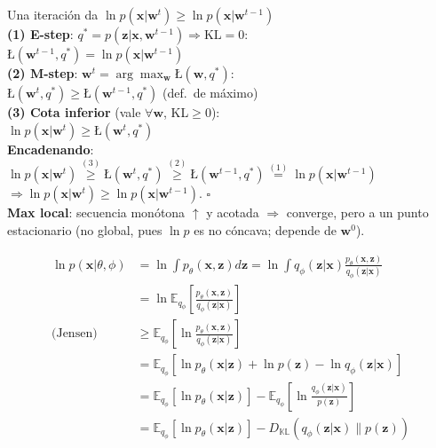 \documentclass[10pt, a4paper]{article}
\newcommand{\w}{\mathbf{w}}
\newcommand{\x}{\mathbf{x}}
\newcommand{\z}{\mathbf{z}}
\newcommand{\ELBO}{\text{\L}}
\newcommand{\E}{\mathbb{E}}
\begin{document}
\begin{minipage}[t]{0.3299\textwidth}
\begin{tcolorbox}[formulabox=Demo: Convergencia de EM, colframe=softBrown]
    Una iteración da $\ln p(\x|\w^t) \geq \ln p(\x|\w^{t-1})$\\
    \textbf{(1) E-step}: $q^* = p(\z|\x,\w^{t-1}) \Rightarrow \text{KL}=0$:\\
    $\ELBO(\w^{t-1},q^*) = \ln p(\x|\w^{t-1})$ \\
    \textbf{(2) M-step}: $\w^t = \arg\max_\w \ELBO(\w,q^*)$:\\
    $\ELBO(\w^t,q^*) \geq \ELBO(\w^{t-1},q^*)$ \quad (def.\ de máximo)\\
    \textbf{(3) Cota inferior} (vale $\forall\w$, KL$\geq 0$):\\
    $\ln p(\x|\w^t) \geq \ELBO(\w^t,q^*)$\\
    \textbf{Encadenando}:\\
    $\ln p(\x|\w^t) \overset{(3)}{\geq} \ELBO(\w^t,q^*) \overset{(2)}{\geq} \ELBO(\w^{t-1},q^*) \overset{(1)}{=} \ln p(\x|\w^{t-1})$\\
    $\Rightarrow \ln p(\x|\w^t) \geq \ln p(\x|\w^{t-1})$. \quad$\square$\\
    \textbf{Max local}: secuencia monótona $\uparrow$ y acotada $\Rightarrow$ converge, pero a un punto estacionario (no global, pues $\ln p$ es no cóncava; depende de $\w^0$).
\end{tcolorbox}

\begin{tcolorbox}[formulabox={Demo: $\mathcal{L}$ VAE}, colframe=softBrown]
    \begin{align*}
        \ln p(\x|\theta, \phi) &= \ln \int  p_\theta(\x,\z) d\z = \ln \int q_\phi(\z|\x) \tfrac{p_\theta(\x,\z)}{q_\phi(\z|\x)} \\
        &= \ln \E_{q_\phi}[\tfrac{p_\theta(\x,\z)}{q_\phi(\z|\x)}] \\
        \text{(Jensen)} &\geq \E_{q_\phi}[\ln \tfrac{p_\theta(\x,\z)}{q_\phi(\z|\x)}] \\
        &= \E_{q_\phi}[\ln p_\theta(\x|\z) + \ln p(\z) - \ln q_\phi(\z|\x)] \\
        &= \E_{q_\phi}[\ln p_\theta(\x|\z)] - \E_{q_\phi}[\ln \tfrac{q_\phi(\z|\x)}{p(\z)}] \\
        &= \E_{q_\phi}[\ln p_\theta(\x|\z)] - D_{\mathbb{KL}}(q_\phi(\z|\x) \| p(\z))
    \end{align*}
\end{tcolorbox}

\end{minipage}
\end{document}
